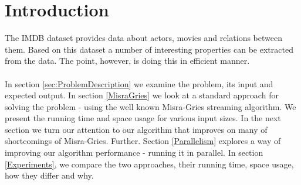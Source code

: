 \label{Introduction}
\section{Introduction}

The IMDB dataset provides data about actors, movies and relations between them. Based on this dataset a number of interesting properties can be extracted from the data. The point, however, is doing this in efficient manner.
\\
\\
In section \ref{sec:ProblemDescription} we examine the problem, its input and expected output. In section \ref{MisraGries} we look at a standard approach for solving the problem - using the well known Misra-Gries streaming algorithm. We present the running time and space usage for various input sizes. In the next section we turn our attention to our algorithm that improves on many of shortcomings of Misra-Gries. Further. Section \ref{Parallelism} explores a way of improving our algorithm performance - running it in parallel. In section \ref{Experiments}, we compare the two approaches, their running time, space usage, how they differ and why.
